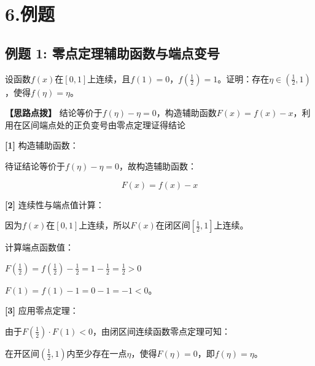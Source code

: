 \documentclass[11pt,a4paper,UTF8]{ctexart}
\begin{document}
\pagestyle{fancy}
\fancyhf{}
\fancyhead[R]{\small\color{TitlePurple}\nouppercase{\leftmark}}
\renewcommand{\headrulewidth}{0.5pt}

\tableofcontents
\newpage
{}


\section{6.例题}


\subsection{例题 1: 零点定理辅助函数与端点变号}

设函数$f(x)$在$[0, 1]$上连续，且$f(1) = 0$，$f\left(\frac{1}{2}\right) = 1$。证明：存在$\eta \in \left(\frac{1}{2}, 1\right)$，使得$f(\eta) = \eta$。

\textbf{\color{DeepPurple}【思路点拨】} 结论等价于$f(\eta) - \eta = 0$，构造辅助函数$F(x) = f(x) - x$，利用在区间端点处的正负变号由零点定理证得结论


\begin{solbox}[分步推导与答题规范]
\textbf{[1]} 构造辅助函数：

待证结论等价于$f(\eta) - \eta = 0$，故构造辅助函数：


\begin{equation*}
F(x) = f(x) - x
\end{equation*}


\textbf{[2]} 连续性与端点值计算：

因为$f(x)$在$[0, 1]$上连续，所以$F(x)$在闭区间$\left[\frac{1}{2}, 1\right]$上连续。

计算端点函数值：

$F\left(\frac{1}{2}\right) = f\left(\frac{1}{2}\right) - \frac{1}{2} = 1 - \frac{1}{2} = \frac{1}{2} > 0$

$F(1) = f(1) - 1 = 0 - 1 = -1 < 0$。

\textbf{[3]} 应用零点定理：

由于$F\left(\frac{1}{2}\right) \cdot F(1) < 0$，由闭区间连续函数零点定理可知：

在开区间$\left(\frac{1}{2}, 1\right)$内至少存在一点$\eta$，使得$F(\eta) = 0$，即$f(\eta) = \eta$。
\end{solbox}
\end{document}
